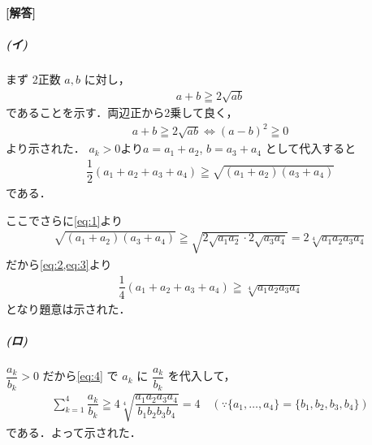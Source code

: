 \documentclass[../../main.tex]{subfiles}
\begin{document}
\begin{oframed}
  
\end{oframed}

{\bf [解答]}

\subparagraph{(イ)}

まず 2正数 $a, b$ に対し，
\begin{align}
  a+b \geqq 2\sqrt{ab} \label{eq:1}
\end{align}
であることを示す．両辺正から2乗して良く，
\begin{align}
  a+b \geqq 2\sqrt{ab} \iff (a-b)^2 \geqq 0
\end{align}
より示された．
$a_k>0$より$a = a_1+a_2$, $b = a_3+a_4$ として代入すると
\begin{align}
  \dfrac{1}{2}(a_1+a_2+a_3+a_4) \geqq \sqrt{(a_1+a_2)(a_3+a_4)} \label{eq:2}
\end{align}
である．

ここでさらに\cref{eq:1}より
\begin{align}
  \sqrt{(a_1+a_2)(a_3+a_4)} \geqq \sqrt{2\sqrt{a_1 a_2} \cdot 2\sqrt{a_3 a_4}} = 2 \sqrt[4]{a_1 a_2 a_3 a_4} \label{eq:3}
\end{align}
だから\cref{eq:2,eq:3}より
\begin{align}
  \dfrac{1}{4}(a_1+a_2+a_3+a_4) \geqq \sqrt[4]{a_1 a_2 a_3 a_4} \label{eq:4}
\end{align}
となり題意は示された．

\subparagraph{(ロ)}

$\dfrac{a_k}{b_k} > 0$ だから\cref{eq:4} で $a_k$ に $\dfrac{a_k}{b_k}$ を代入して，
\begin{align}
  \sum_{k=1}^4 \dfrac{a_k}{b_k}
  \geqq
  4 \sqrt[4]{\dfrac{a_1 a_2 a_3 a_4}{b_1 b_2 b_3 b_4}}
  = 4 \quad (\because \{a_1, \dots, a_4\} = \{b_1, b_2, b_3, b_4\})
\end{align}
である．よって示された．
\end{document}
